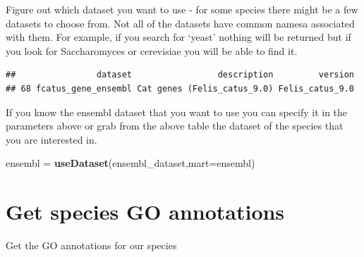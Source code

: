 \documentclass[
]{book}
\newenvironment{Shaded}{\begin{snugshade}}{\end{snugshade}}
\newcommand{\AttributeTok}[1]{\textcolor[rgb]{0.13,0.29,0.53}{#1}}
\newcommand{\CommentTok}[1]{\textcolor[rgb]{0.56,0.35,0.01}{\textit{#1}}}
\newcommand{\ConstantTok}[1]{\textcolor[rgb]{0.56,0.35,0.01}{#1}}
\newcommand{\FunctionTok}[1]{\textcolor[rgb]{0.13,0.29,0.53}{\textbf{#1}}}
\newcommand{\NormalTok}[1]{#1}
\newcommand{\OtherTok}[1]{\textcolor[rgb]{0.56,0.35,0.01}{#1}}
\newcommand{\SpecialCharTok}[1]{\textcolor[rgb]{0.81,0.36,0.00}{\textbf{#1}}}
\begin{document}
Figure out which dataset you want to use - for some species there might be a few datasets to choose from. Not all of the datasets have common namesa associated with them. For example, if you search for `yeast' nothing will be returned but if you look for Saccharomyces or cerevisiae you will be able to find it.

\begin{Shaded}
\end{Shaded}

\begin{verbatim}
##                dataset                 description         version
## 68 fcatus_gene_ensembl Cat genes (Felis_catus_9.0) Felis_catus_9.0
\end{verbatim}

If you know the ensembl dataset that you want to use you can specify it in the parameters above or grab from the above table the dataset of the species that you are interested in.

\begin{Shaded}
\begin{Highlighting}[]
\NormalTok{ensembl }\OtherTok{=} \FunctionTok{useDataset}\NormalTok{(ensembl\_dataset,}\AttributeTok{mart=}\NormalTok{ensembl)}
\end{Highlighting}
\end{Shaded}

\section{Get species GO annotations}\label{get-species-go-annotations}

Get the GO annotations for our species
\end{document}
